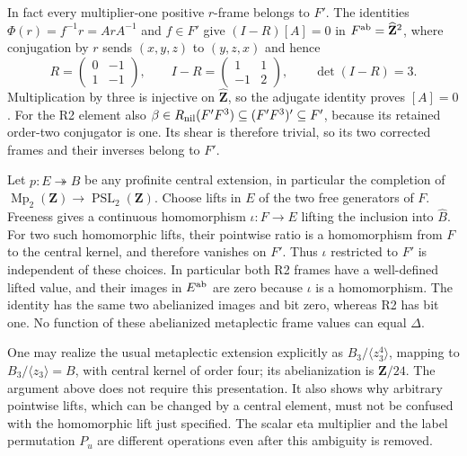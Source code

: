 In fact every multiplier-one positive $r$-frame belongs to $F'$.
The identities $\Phi(r)=f^{-1}r=ArA^{-1}$ and $f\in F'$
give $(I-R)[A]=0$ in $F^{\rm ab}=\widehat{\mathbf Z}^2$, where
conjugation by $r$ sends $(x,y,z)$ to $(y,z,x)$ and hence
\[
 R=\begin{pmatrix}0&-1\\1&-1\end{pmatrix},\qquad
 I-R=\begin{pmatrix}1&1\\-1&2\end{pmatrix},\qquad\det(I-R)=3.
\]
Multiplication by three is injective on $\widehat{\mathbf Z}$,
so the adjugate identity proves $[A]=0$. For the R2 element also
$\beta\in R_{\rm nil}(F'F^3)\subseteq(F'F^3)'\subseteq F'$,
because its retained order-two conjugator is one. Its shear is
therefore trivial, so its two corrected frames and their inverses
belong to $F'$.

Let $p:E\twoheadrightarrow\widehat B$ be any profinite central
extension, in particular the completion of
$\operatorname{Mp}_2(\mathbf Z)\to\operatorname{PSL}_2(\mathbf Z)$.
Choose lifts in $E$ of the two free generators of $F$. Freeness
gives a continuous homomorphism $\iota:F\to E$ lifting the
inclusion into $\widehat B$. For two such homomorphic lifts,
their pointwise ratio is a homomorphism from $F$ to the central
kernel, and therefore vanishes on $F'$. Thus $\iota$ restricted
to $F'$ is independent of these choices. In particular both
R2 frames have a well-defined lifted value, and their images
in $E^{\rm ab}$ are zero because $\iota$ is a homomorphism.
The identity has the same two abelianized images and bit zero,
whereas R2 has bit one. No function of these abelianized
metaplectic frame values can equal $\Delta$.

One may realize the usual metaplectic extension explicitly as
$B_3/\langle z_3^4\rangle$, mapping to
$B_3/\langle z_3\rangle=B$, with central kernel of order four;
its abelianization is $\mathbf Z/24$. The argument above does
not require this presentation. It also shows why arbitrary
pointwise lifts, which can be changed by a central element,
must not be confused with the homomorphic lift just specified.
The scalar eta multiplier and the label permutation $P_u$
are different operations even after this ambiguity is removed.

